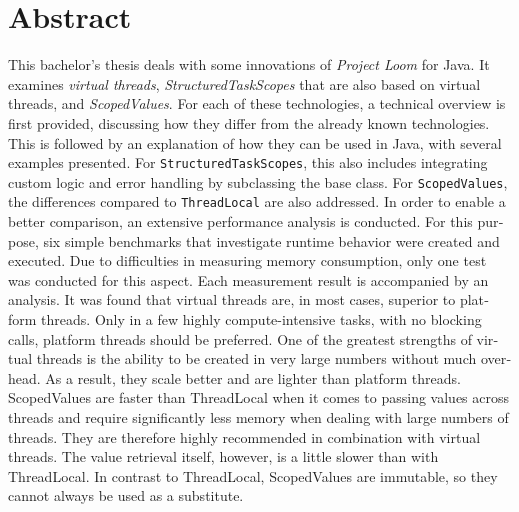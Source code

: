 \chapter{Abstract}


\begin{english} %
    This bachelor's thesis deals with some innovations of \emph{Project Loom} for Java. It examines \emph{virtual threads}, \emph{StructuredTaskScopes} that are also based on virtual threads,
    and \emph{ScopedValues}. For each of these technologies, a technical overview is first provided, discussing how they differ from the already known technologies. 
    This is followed by an explanation of how they can be used in Java, with several examples presented. For \texttt{StructuredTaskScopes}, this also includes integrating custom logic and error handling by
    subclassing the base class. For \texttt{ScopedValues}, the differences compared to \texttt{ThreadLocal} are also addressed. In order to enable a better comparison, an extensive performance analysis is conducted. 
    For this purpose, six simple benchmarks that investigate runtime behavior were created and executed. Due to difficulties in measuring 
    memory consumption, only one test was conducted for this aspect. Each measurement result is accompanied by an analysis. 
    It was found that virtual threads are, in most cases, superior to platform threads. Only in a few highly compute-intensive tasks, with no blocking calls,  platform threads should be preferred. 
    One of the greatest strengths of virtual threads is the ability to be created in very large numbers without much overhead. As a result, they scale better and are lighter than platform threads.
    ScopedValues are faster than ThreadLocal when it comes to passing values across threads and require significantly less memory when dealing with large numbers of threads. 
    They are therefore highly recommended in combination with virtual threads. 
    The value retrieval itself, however, is a little slower than with ThreadLocal. In contrast to ThreadLocal, ScopedValues are immutable, so they cannot always be used as a substitute.

\end{english}

